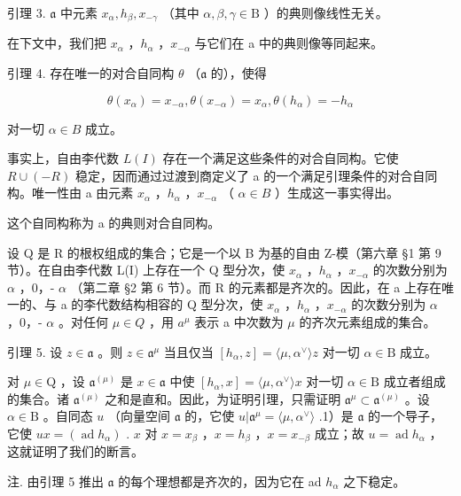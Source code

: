 引理 3. \(\mathfrak{a}\) 中元素 \(x_{\alpha}, h_{\beta}, x_{-\gamma}\) （其中 \(\alpha, \beta, \gamma \in \mathrm{B}\) ）的典则像线性无关。

在下文中，我们把 \(x_{\alpha}\) ，\(h_{\alpha}\) ，\(x_{-\alpha}\) 与它们在 a 中的典则像等同起来。

引理 4. 存在唯一的对合自同构 \(\theta\) （\(\mathfrak{a}\) 的），使得

\[
\theta (x _ {\alpha}) = x _ {- \alpha}, \theta (x _ {- \alpha}) = x _ {\alpha}, \theta (h _ {\alpha}) = - h _ {\alpha}
\]

对一切 \(\alpha\in B\) 成立。

事实上，自由李代数 \(L(I)\) 存在一个满足这些条件的对合自同构。它使 \(R \cup (-R)\) 稳定，因而通过过渡到商定义了 a 的一个满足引理条件的对合自同构。唯一性由 a 由元素 \(x_{\alpha}\) ，\(h_{\alpha}\) ，\(x_{-\alpha}\) （ \(\alpha \in B\) ）生成这一事实得出。

这个自同构称为 a 的典则对合自同构。

设 Q 是 R 的根权组成的集合；它是一个以 B 为基的自由 Z-模（第六章 §1 第 9 节）。在自由李代数 L(I) 上存在一个 Q 型分次，使 \(x_{\alpha}\) ，\(h_{\alpha}\) ，\(x_{-\alpha}\) 的次数分别为 \(\alpha\) ，0，- \(\alpha\) （第二章 §2 第 6 节）。而 R 的元素都是齐次的。因此，在 a 上存在唯一的、与 a 的李代数结构相容的 Q 型分次，使 \(x_{\alpha}\) ，\(h_{\alpha}\) ，\(x_{-\alpha}\) 的次数分别为 \(\alpha\) ，0，- \(\alpha\) 。对任何 \(\mu \in Q\) ，用 \(a^{\mu}\) 表示 a 中次数为 \(\mu\) 的齐次元素组成的集合。

引理 5. 设 \(z \in \mathfrak{a}\) 。则 \(z \in \mathfrak{a}^{\mu}\) 当且仅当 \([h_{\alpha}, z] = \langle \mu, \alpha^{\vee} \rangle z\) 对一切 \(\alpha \in \mathrm{B}\) 成立。

对 \(\mu \in \mathrm{Q}\) ，设 \(\mathfrak{a}^{(\mu)}\) 是 \(x \in \mathfrak{a}\) 中使 \([h_{\alpha}, x] = \langle \mu, \alpha^{\vee} \rangle x\) 对一切 \(\alpha \in \mathrm{B}\) 成立者组成的集合。诸 \(\mathfrak{a}^{(\mu)}\) 之和是直和。因此，为证明引理，只需证明 \(\mathfrak{a}^{\mu} \subset \mathfrak{a}^{(\mu)}\) 。设 \(\alpha \in \mathrm{B}\) 。自同态 \(u\) （向量空间 \(\mathfrak{a}\) 的，它使 \(u|\mathfrak{a}^{\mu} = \langle \mu, \alpha^{\vee} \rangle\) .1）是 \(\mathfrak{a}\) 的一个导子，它使 \(ux = (\operatorname{ad} h_{\alpha})\) . \(x\) 对 \(x = x_{\beta}\) ，\(x = h_{\beta}\) ，\(x = x_{-\beta}\) 成立；故 \(u = \operatorname{ad} h_{\alpha}\) ，这就证明了我们的断言。

注. 由引理 5 推出 \(\mathfrak{a}\) 的每个理想都是齐次的，因为它在 ad \(h_{\alpha}\) 之下稳定。

